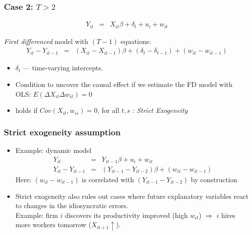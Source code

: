 \documentclass[notes=show,beamer,compress]{beamer}
\begin{document}

\begin{frame}
\frametitle{Case 2: $T>2$}

\begin{eqnarray*}
Y_{it} &=&  X_{it}\beta + \delta_t +  u_i+ w_{it}
\end{eqnarray*}

\emph{First differenced} model with $(T-1)$ equations:
\begin{eqnarray*}
Y_{it}-Y_{it-1} &= & (X_{it}-X_{it-1})\beta + ( \delta_t - \delta_{t-1}) + (w_{it}-w_{it-1})
\end{eqnarray*}
\begin {itemize}
\item $\delta_t$ --- time-varying intercepts.
\item Condition to uncover the causal effect if we estimate the FD model with OLS: $E(\Delta{}X_{it} \Delta{}w_{it})=0$

\item holds if $Cov( X_{it},w_{is})=0$,  for all $t,s$ : \emph{Strict Exogeneity}
\end {itemize}
\end{frame}


\begin{frame}
\frametitle{Strict exogeneity assumption}
\begin {itemize}
\item Example: dynamic model
\begin{eqnarray*}
Y_{it} &=&  Y_{it-1} \beta + u_i + w_{it} \\
Y_{it}-Y_{it-1} &= & (Y_{it-1}-Y_{it-2})\beta+ (w_{it}-w_{it-1})
\end{eqnarray*}
Here: $(w_{it}-w_{it-1})$ is correlated with  $(Y_{it-1}-Y_{it-2})$ by construction
\item Strict exogeneity also rules out cases where future explanatory variables react to changes in the idiosyncratic errors.\\\medskip
Example: firm $i$ discovers its productivity improved (high $w_{it}$) $\Longrightarrow$ $i$ hires more workers tomorrow ($X_{it+1}\uparrow$).
\end {itemize}
\end{frame}
\end{document}
